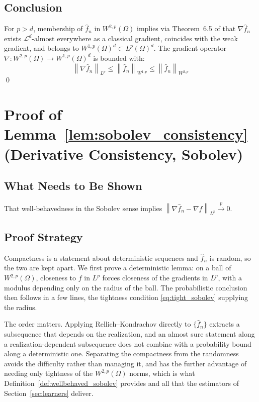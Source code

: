 \documentclass[12pt,a4paper]{article}
\numberwithin{equation}{section}
\theoremstyle{plain}
\theoremstyle{definition}
\newcommand{\norm}[1]{\left\| #1 \right\|}
\newcommand{\Wtwop}{W^{2,p}(\Omega)}
\newcommand{\fn}{\hat{f}_n}
\newcommand{\xrightarrowp}{\xrightarrow{p}}
\begin{document}
	\subsection{Conclusion}
	
	For $p > d$, membership of $\fn$ in $W^{2,p}(\Omega)$ implies via
	Theorem~6.5 of \citet{evans2015measure} that $\nabla \fn$ exists
	$\mathcal{L}^d$-almost everywhere as a classical gradient, coincides with
	the weak gradient, and belongs to $W^{1,p}(\Omega)^d \subset L^p(\Omega)^d$.
	The gradient operator $\nabla: W^{2,p}(\Omega) \to W^{1,p}(\Omega)^d$ is
	bounded with:
	\begin{equation}
		\norm{\nabla \fn}_{L^p}
		\leq \norm{\fn}_{W^{1,p}}
		\leq \norm{\fn}_{W^{2,p}}
	\end{equation}
	\qed
	
	\section{Proof of Lemma~\ref{lem:sobolev_consistency}
		(Derivative Consistency, Sobolev)}
	\label{app:lem_sobolev_consistency}
	
	\subsection{What Needs to Be Shown}
	
	That well-behavedness in the Sobolev sense implies
	$\norm{\nabla \fn - \nabla f}_{L^p} \xrightarrowp 0$.
	
	\subsection{Proof Strategy}

	Compactness is a statement about deterministic sequences and $\fn$ is
	random, so the two are kept apart. We first prove a deterministic lemma: on
	a ball of $\Wtwop$, closeness to $f$ in $L^p$ forces closeness of the
	gradients in $L^p$, with a modulus depending only on the radius of the ball.
	The probabilistic conclusion then follows in a few lines, the tightness
	condition \eqref{eq:tight_sobolev} supplying the radius.

	The order matters. Applying Rellich--Kondrachov directly to $\{\fn\}$
	extracts a subsequence that depends on the realization, and an almost sure
	statement along a realization-dependent subsequence does not combine with a
	probability bound along a deterministic one. Separating the compactness from
	the randomness avoids the difficulty rather than managing it, and has the
	further advantage of needing only tightness of the $\Wtwop$ norms, which is
	what Definition~\ref{def:wellbehaved_sobolev} provides and all that the
	estimators of Section~\ref{sec:learners} deliver.
\end{document}
